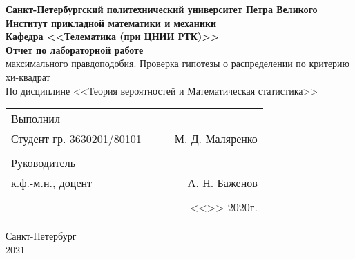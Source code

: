 \documentclass[12pt]{article}
\begin{document}
\begin{titlepage}
	\begin{center}
		\hfill \break
		{\textbf{Санкт-Петербургский политехнический университет Петра Великого}}\\
		\hfill \break
		\textbf{Институт прикладной математики и механики}\\
		 \hfill \break
		\textbf{Кафедра <<Телематика (при ЦНИИ РТК)>>}\\
		\vfill
		\large{\bfseries Отчет по лабораторной работе}\\
		\hfill \break
		\hfill \break
		\hfill \break
		\hfill \break
        \normalsize{ максимального правдоподобия. Проверка гипотезы о распределении по критерию хи-квадрат}\\
        \hfill \break
		По дисциплине <<Теория вероятностей и Математическая статистика>>\\
		\hfill \break
		\hfill \break
	\end{center}
 
	\normalsize
	{ 
		\begin{tabular}{lp{2cm}cr}
			Выполнил &&&\\
			Студент гр. 3630201/80101&&\underline{\hspace{1.5cm}}& М. Д. Маляренко\\\\
			Руководитель&&&\\ 
			к.ф.-м.н., доцент && \underline{\hspace{1.5cm}}& А. Н. Баженов \\\\
			&&&<<\underline{\phantom{333}}>>\underline{\phantom{сентября000}}
			2020г.
		\end{tabular}
	}
\vfill

\begin{center} Санкт-Петербург \\2021 \end{center}
\end{titlepage}

\newpage

\setcounter{page}{2}
\end{document}
